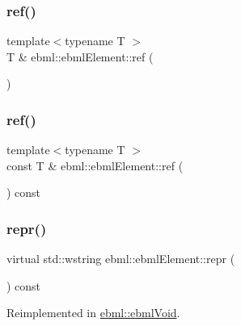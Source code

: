 \subsubsection{\texorpdfstring{ref()}{ref()}\hspace{0.1cm}{\footnotesize\ttfamily [1/2]}}
{\footnotesize\ttfamily template$<$typename T $>$ \\
T \& ebml\+::ebml\+Element\+::ref (\begin{DoxyParamCaption}{ }\end{DoxyParamCaption})}

\mbox{\label{classebml_1_1ebmlElement_aa2679e147ba5fdf83a0da3efd090593f}} 
\subsubsection{\texorpdfstring{ref()}{ref()}\hspace{0.1cm}{\footnotesize\ttfamily [2/2]}}
{\footnotesize\ttfamily template$<$typename T $>$ \\
const T \& ebml\+::ebml\+Element\+::ref (\begin{DoxyParamCaption}{ }\end{DoxyParamCaption}) const}

\mbox{\label{classebml_1_1ebmlElement_a77865a71f4bab782817ec82e88fb5198}} 
\subsubsection{\texorpdfstring{repr()}{repr()}}
{\footnotesize\ttfamily virtual std\+::wstring ebml\+::ebml\+Element\+::repr (\begin{DoxyParamCaption}{ }\end{DoxyParamCaption}) const\hspace{0.3cm}{\ttfamily [virtual]}}



Reimplemented in \mbox{\hyperlink{classebml_1_1ebmlVoid_a54f5a77bc4029d77d0a456fa8dcb53ef}{ebml\+::ebml\+Void}}.

\mbox{\label{classebml_1_1ebmlElement_a9c9ed1823c036c8a77a64c68e12e769f}} 
